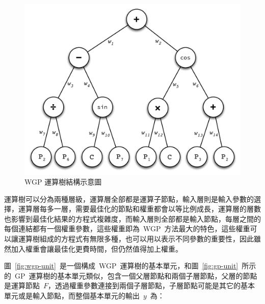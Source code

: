 \begin{figure}[hbtp]
  \begin{center}
    \includegraphics[width=1.0\textwidth]{figures/wgp-sample.pdf}
    \caption{WGP 運算樹結構示意圖} 
    \label{fig:WGP-sample}
  \end{center}
\end{figure}


運算樹可以分為兩種層級，運算層全部都是運算子節點，輸入層則是輸入參數的選擇，運算層每多一層，需要最佳化的節點和權重都會以等比例成長，運算層的層數也影響到最佳化結果的方程式複雜度，而輸入層則全部都是輸入節點，每層之間的每個連結都有一個權重參數，這些權重即為~WGP~方法最大的特色，這些權重可以讓運算樹組成的方程式有無限多種，也可以用以表示不同參數的重要性，因此雖然加入權重會讓最佳化更費時間，但仍然值得加上權重。

圖~\ref{fig:wgp-unit}~是一個構成~WGP~運算樹的基本單元，和圖~\ref{fig:gp-unit}~所示的~GP~運算樹的基本單元類似，包含一個父層節點和兩個子層節點，父層的節點是運算節點~$F$，透過權重參數連接到兩個子層節點，子層節點可能是其它的基本單元或是輸入節點，而整個基本單元的輸出~$y$~為：

